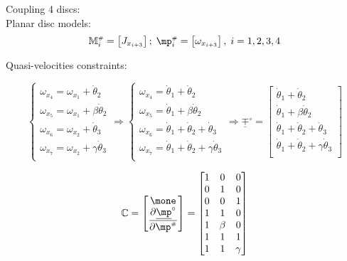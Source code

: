 \documentclass[a4paper,11pt,brazil,fleqn]{article}
\begin{document}
Coupling 4 discs: \\

Planar disc models: 
\begin{equation}
\mM\ssh_i = \begin{bmatrix} J_{x_{i+3}} \end{bmatrix}; \; \mp\ssh_i = \begin{bmatrix} \omega_{x_{i+3}} \end{bmatrix}, \; i = 1, 2, 3, 4
\end{equation}

Quasi-velocities constraints:

\begin{equation}
\begin{cases}
\omega_{x_4} = \omega_{x_1} + \dot{\theta}_2 \\
\omega_{x_5} = \omega_{x_1} + \beta\dot{\theta}_2 \\
\omega_{x_6} = \omega_{x_2} + \dot{\theta}_3 \\
\omega_{x_7} = \omega_{x_2} + \gamma\dot{\theta}_3 \\
\end{cases}
\Rightarrow
\begin{cases}
\omega_{x_4} = \dot{\theta}_1 + \dot{\theta}_2 \\
\omega_{x_5} = \dot{\theta}_1 + \beta\dot{\theta}_2 \\
\omega_{x_6} = \dot{\theta}_1 + \dot{\theta}_2 + \dot{\theta}_3 \\
\omega_{x_7} = \dot{\theta}_1 + \dot{\theta}_2 + \gamma\dot{\theta}_3 \\
\end{cases}
\Rightarrow
\underline{\mp}^\circ = 
\begin{bmatrix}
\dot{\theta}_1 + \dot{\theta}_2 \\
\dot{\theta}_1 + \beta\dot{\theta}_2 \\
\dot{\theta}_1 + \dot{\theta}_2 + \dot{\theta}_3 \\
\dot{\theta}_1 + \dot{\theta}_2 + \gamma\dot{\theta}_3 \\
\end{bmatrix}
\end{equation}

\begin{equation}
\mC =
\begin{bmatrix}
\mone \\
\displaystyle\frac{\partial \underline{\mp}^\circ}{\partial \mp\ssh}
\end{bmatrix}  =
\begin{bmatrix}
1 & 0 & 0 \\
0 & 1 & 0 \\
0 & 0 & 1 \\
1 & 1     & 0 \\
1 & \beta & 0 \\
1 & 1     & 1 \\
1 & 1     & \gamma \\
\end{bmatrix} 
\end{equation}
\end{document}
